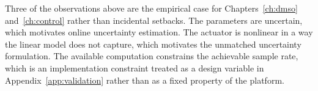 \begin{remark}
Three of the observations above are the empirical case for
Chapters~\ref{ch:dmso} and~\ref{ch:control} rather than incidental setbacks. The
parameters are uncertain, which motivates online uncertainty estimation. The
actuator is nonlinear in a way the linear model does not capture, which
motivates the unmatched uncertainty formulation. The available computation
constrains the achievable sample rate, which is an implementation constraint
treated as a design variable in Appendix~\ref{app:validation} rather than as a
fixed property of the platform.
\end{remark}
